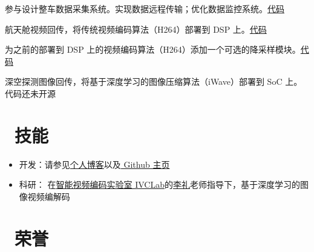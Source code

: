 \documentclass[../main]{subfiles}
\begin{document}
%
参与设计整车数据采集系统。实现数据远程传输；优化数据监控系统。\href{https://github.com/Freed-Wu/steering-wheel-mcu}{代码}

%
航天舱视频回传，将传统视频编码算法（H264）部署到 DSP 上。\href{https://github.com/Freed-Wu/x264}{代码}

%
为之前的部署到 DSP 上的视频编码算法（H264）添加一个可选的降采样模块。\href{https://github.com/Freed-Wu/x264-dsp}{代码}

%
深空探测图像回传，将基于深度学习的图像压缩算法（iWave）部署到 SoC 上。
代码还未开源

\section{\faCogs\ 技能}%
\label{sec:zh_skills}

\begin{itemize}
  \item 开发：请参见\href{https://freed-wu.github.io}{个人博客}以及\href{https://www.github.com/Freed-Wu}{ Github 主页}
  \item 科研： 在\href{https://ustc-ivclab.github.io}{智能视频编码实验室 IVCLab}的\href{https://ustc-ivclab.github.io/people/2020/09/01/li,-li.html}{李礼}老师指导下，基于深度学习的图像视频编解码
\end{itemize}

\section{\faHeart\ 荣誉}%
\label{sec:zh_honors}

\end{document}
